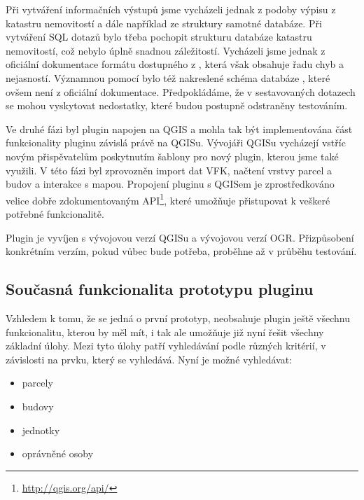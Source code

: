 \documentclass[a4paper,10pt]{article}
\begin{document}
Při vytváření informačních výstupů jsme vycházeli jednak z podoby výpisu z katastru nemovitostí a dále například ze struktury samotné databáze.
Při vytváření SQL dotazů bylo třeba pochopit strukturu databáze katastru nemovitostí, což nebylo úplně snadnou záležitostí.
Vycházeli jsme jednak z oficiální dokumentace formátu dostupného z \cite{VFKDokumentace},
která však obsahuje řadu  chyb a nejasností.
Významnou pomocí bylo též nakreslené schéma databáze \cite{MartinThesis}, které ovšem není z oficiální dokumentace.
Předpokládáme, že v sestavovaných dotazech se mohou vyskytovat nedostatky, které budou postupně odstraněny testováním.

Ve druhé fázi byl plugin napojen na QGIS a mohla tak být implementována část funkcionality pluginu závislá právě na QGISu.
Vývojáři QGISu vycházejí vstříc novým přispěvatelům poskytnutím šablony pro nový plugin, kterou jsme také využili.
V této fázi byl zprovozněn import dat VFK, načtení vrstvy parcel a budov a interakce s mapou.
Propojení pluginu s QGISem je zprostředkováno velice dobře zdokumentovaným API\footnote{\url{http://qgis.org/api/}},
které umožňuje přistupovat k veškeré potřebné funkcionalitě.

Plugin je vyvíjen s vývojovou verzí QGISu a vývojovou verzí OGR.
Přizpůsobení konkrétním verzím, pokud vůbec bude potřeba, proběhne až v průběhu testování.

\subsection{Současná funkcionalita prototypu pluginu}
Vzhledem k tomu, že se jedná o první prototyp, neobsahuje plugin ještě všechnu funkcionalitu, kterou by měl mít,
i tak ale umožňuje již nyní řešit všechny základní úlohy.
Mezi tyto úlohy patří vyhledávání podle různých kritérií, v závislosti na prvku, který se vyhledává.
Nyní je možné vyhledávat:
\begin{itemize}
    \item parcely
    \item budovy
    \item jednotky
    \item oprávněné osoby
\end{itemize}
\end{document}
